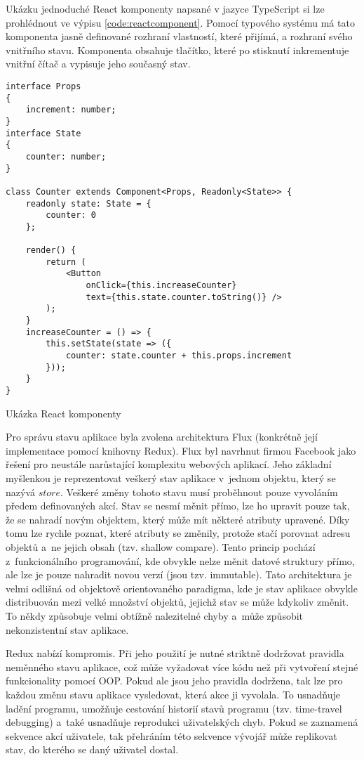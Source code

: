 Ukázku jednoduché React komponenty napsané v jazyce TypeScript si lze prohlédnout ve výpisu \ref{code:reactcomponent}. Pomocí typového systému má tato komponenta jasně definované rozhraní vlastností, které přijímá, a rozhraní svého vnitřního stavu. Komponenta obsahuje tlačítko, které po stisknutí inkrementuje vnitřní čítač a vypisuje jeho současný stav.

\begin{listing}
\begin{verbatim}
interface Props
{
    increment: number;
}
interface State
{
    counter: number;
}

class Counter extends Component<Props, Readonly<State>> {
    readonly state: State = {
        counter: 0
    };

    render() {
        return (
            <Button
                onClick={this.increaseCounter}
                text={this.state.counter.toString()} />
        );
    }
    increaseCounter = () => {
        this.setState(state => ({
            counter: state.counter + this.props.increment
        }));
    }
}
\end{verbatim}
\caption{Ukázka React komponenty}
\label{code:reactcomponent}
\end{listing}

Pro správu stavu aplikace byla zvolena architektura Flux (konkrétně její implementace pomocí knihovny Redux). Flux byl navrhnut firmou Facebook jako řešení pro neustále narůstající komplexitu webových aplikací. Jeho základní myšlenkou je reprezentovat veškerý stav aplikace v~jednom objektu, který se nazývá $store$. Veškeré změny tohoto stavu musí proběhnout pouze vyvoláním předem definovaných akcí. Stav se nesmí měnit přímo, lze ho upravit pouze tak, že se nahradí novým objektem, který může mít některé atributy upravené. Díky tomu lze rychle poznat, které atributy se změnily, protože stačí porovnat adresu objektů a~ne jejich obsah (tzv. shallow compare). Tento princip pochází z~funkcionálního programování, kde obvykle nelze měnit datové struktury přímo, ale lze je pouze nahradit novou verzí (jsou tzv. immutable). Tato architektura je velmi odlišná od objektově orientovaného paradigma, kde je stav aplikace obvykle distribuován mezi velké množství objektů, jejichž stav se může kdykoliv změnit. To někdy způsobuje velmi obtížně nalezitelné chyby a~může způsobit nekonzistentní stav aplikace.

Redux nabízí kompromis. Při jeho použití je nutné striktně dodržovat pravidla neměnného stavu aplikace, což může vyžadovat více kódu než při vytvoření stejné funkcionality pomocí OOP. Pokud ale jsou jeho pravidla dodržena, tak lze pro každou změnu stavu aplikace vysledovat, která akce ji vyvolala. To usnadňuje ladění programu, umožňuje cestování historií stavů programu (tzv. time-travel debugging) a~také usnadňuje reprodukci uživatelských chyb. Pokud se zaznamená sekvence akcí uživatele, tak přehráním této sekvence vývojář může replikovat stav, do kterého se daný uživatel dostal. 

